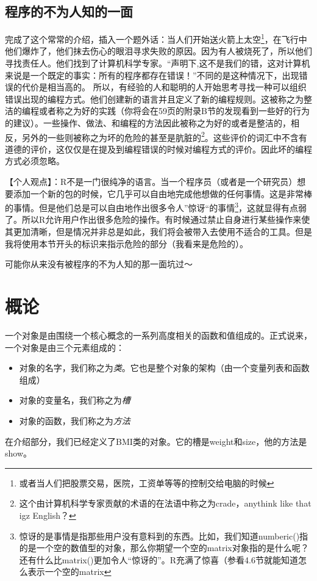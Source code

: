 \documentclass[12pt,a4paper]{article}\usepackage{graphicx, color}
\begin{document}
\subsection{程序的不为人知的一面}
完成了这个常常的介绍，插入一个题外话：当人们开始送火箭上太空\footnote{或者当人们把股票交易，医院，工资单等等的控制交给电脑的时候}，在飞行中他们爆炸了，他们抹去伤心的眼泪寻求失败的原因。因为有人被烧死了，所以他们寻找责任人。他们找到了计算机科学专家。“声明下,这不是我们的错，这对计算机来说是一个既定的事实：所有的程序都存在错误！”不同的是这种情况下，出现错误的代价是相当高的。
所以，有经验的人和聪明的人开始思考寻找一种可以组织错误出现的编程方式。他们创建新的语言并且定义了新的编程规则。这被称之为整洁的编程或者称之为好的实践（你将会在59页的附录B节的发现看到一些好的行为的建议）。一些操作、做法、和编程的方法因此被称之为好的或者是整洁的，相反，另外的一些则被称之为坏的危险的甚至是肮脏的\footnote{这个由计算机科学专家贡献的术语的在法语中称之为crade，anythink like that igz English？}。这些评价的词汇中不含有道德的评价，这仅仅是在提及到编程错误的时候对编程方式的评价。因此坏的编程方式必须忽略。

\scalebox{4}{\HandRight}【个人观点】：R不是一门很纯净的语言。当一个程序员（或者是一个研究员）想要添加一个新的包的时候，它几乎可以自由地完成他想做的任何事情。这是非常棒的事情。但是他们总是可以自由地作出很多令人”惊讶“的事情\footnote{惊讶的是事情是指那些用户没有意料到的东西。比如，我们知道numberic()指的是一个空的数值型的对象，那么你期望一个空的matrix对象指的是什么呢？还有什么比matrix()更加令人“惊讶的”。R充满了惊喜（参看4.6节就能知道怎么表示一个空的matrix}，这就显得有点弱了。所以R允许用户作出很多危险的操作。有时候通过禁止自身进行某些操作来使其更加清晰，但是情况并非总是如此，我们将会被带入去使用不适合的工具。但是我将使用本节开头的标识来指示危险的部分（我看来是危险的）。
\centerline{可能你从来没有被程序的不为人知的那一面坑过～} 

\section{概论}
一个对象是由围绕一个核心概念的一系列高度相关的函数和值组成的。正式说来，一个对象是由三个元素组成的：
\begin{itemize}
  \item 对象的名字，我们称之为\emph{类}。它也是整个对象的架构（由一个变量列表和函数组成）
  \item 对象的变量名，我们称之为\emph{槽}
  \item 对象的函数，我们称之为\emph{方法}
\end{itemize}
在介绍部分，我们已经定义了BMI类的对象。它的槽是weight和size，他的方法是show。
\end{document}

